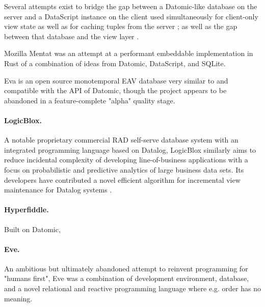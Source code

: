 Several attempts exist to bridge the gap between a Datomic-like database on the server and a DataScript instance on the client used simultaneously for client-only view state as well as for caching tuples from the server \cite{small16datscript}; as well as the gap between that database and the view layer \cite{parker15posh,krivosheev19reposh}.

Mozilla Mentat \cite{mozillamentat} was an attempt at a performant embeddable implementation in Rust of a combination of ideas from Datomic, DataScript, and SQLite.

Eva \cite{eva} is an open source monotemporal EAV database very similar to and compatible with the \gls{API} of Datomic, though the project appears to be abandoned in a feature-complete "alpha" quality stage.

\paragraph{LogicBlox.} A notable proprietary commercial RAD self-serve database system with an integrated programming language based on Datalog, LogicBlox similarly aims to reduce incidental complexity of developing line-of-business applications with a focus on probabilistic and predictive analytics of large business data sets. Its developers have contributed a novel efficient algorithm for incremental view maintenance for Datalog systems \cite{aref2015design}.


\paragraph{Hyperfiddle.} Built on Datomic, \cite{getz18hyperfiddle}


\paragraph{Eve.} An ambitious but ultimately abandoned attempt to reinvent programming for "humans first", Eve \cite{eve} was a combination of development environment, database, and a novel relational and reactive programming language where e.g. order has no meaning.

